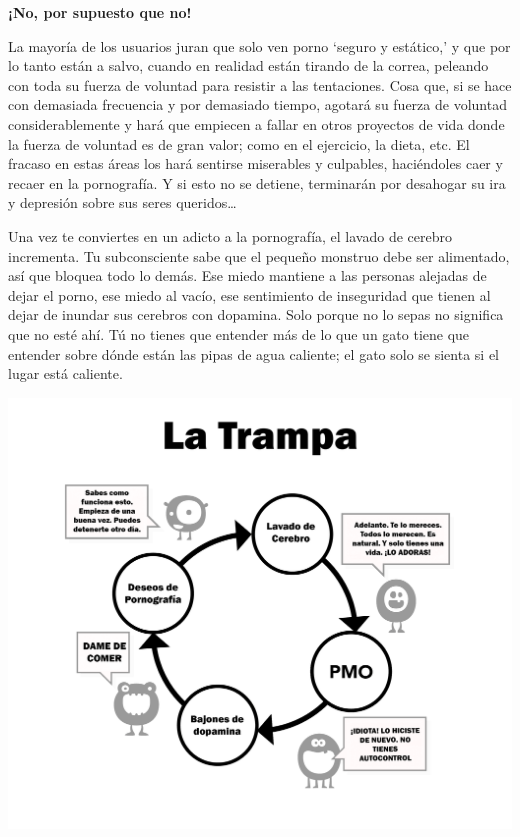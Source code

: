 \documentclass[
  spanish,
  openany]{book}
\begin{document}
\textbf{¡No, por supuesto que no!}

La mayoría de los usuarios juran que solo ven porno `seguro y estático,' y que por lo tanto están a salvo, cuando en realidad están tirando de la correa, peleando con toda su fuerza de voluntad para resistir a las tentaciones. Cosa que, si se hace con demasiada frecuencia y por demasiado tiempo, agotará su fuerza de voluntad considerablemente y hará que empiecen a fallar en otros proyectos de vida donde la fuerza de voluntad es de gran valor; como en el ejercicio, la dieta, etc. El fracaso en estas áreas los hará sentirse miserables y culpables, haciéndoles caer y recaer en la pornografía. Y si esto no se detiene, terminarán por desahogar su ira y depresión sobre sus seres queridos\ldots{}

Una vez te conviertes en un adicto a la pornografía, el lavado de cerebro incrementa. Tu subconsciente sabe que el pequeño monstruo debe ser alimentado, así que bloquea todo lo demás. Ese miedo mantiene a las personas alejadas de dejar el porno, ese miedo al vacío, ese sentimiento de inseguridad que tienen al dejar de inundar sus cerebros con dopamina. Solo porque no lo sepas no significa que no esté ahí. Tú no tienes que entender más de lo que un gato tiene que entender sobre dónde están las pipas de agua caliente; el gato solo se sienta si el lugar está caliente.

\includegraphics{img-la-trampa.png}\\
\end{document}

